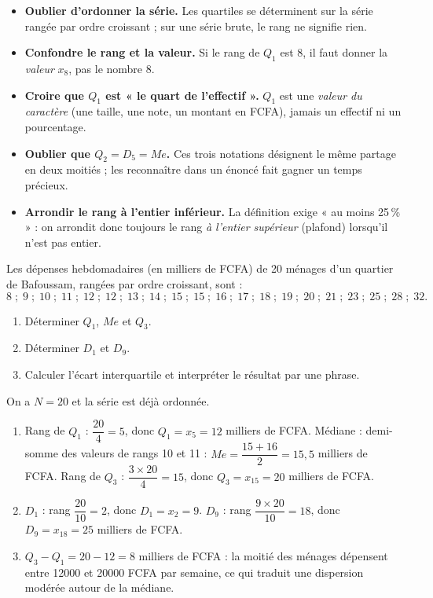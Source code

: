 \documentclass[11pt]{article}
\begin{document}
\begin{attention}
\begin{itemize}
\item \textbf{Oublier d'ordonner la série.} Les quartiles se déterminent sur la série rangée par ordre croissant ; sur une série brute, le rang ne signifie rien.
\item \textbf{Confondre le rang et la valeur.} Si le rang de $Q_1$ est 8, il faut donner la \emph{valeur} $x_8$, pas le nombre 8.
\item \textbf{Croire que $Q_1$ est « le quart de l'effectif ».} $Q_1$ est une \emph{valeur du caractère} (une taille, une note, un montant en FCFA), jamais un effectif ni un pourcentage.
\item \textbf{Oublier que $Q_2 = D_5 = Me$.} Ces trois notations désignent le même partage en deux moitiés ; les reconnaître dans un énoncé fait gagner un temps précieux.
\item \textbf{Arrondir le rang à l'entier inférieur.} La définition exige « au moins 25\,\% » : on arrondit donc toujours le rang \emph{à l'entier supérieur} (plafond) lorsqu'il n'est pas entier.
\end{itemize}
\end{attention}

\begin{exercice}
Les dépenses hebdomadaires (en milliers de FCFA) de 20 ménages d'un quartier de Bafoussam, rangées par ordre croissant, sont :
\[ 8 \;;\; 9 \;;\; 10 \;;\; 11 \;;\; 12 \;;\; 12 \;;\; 13 \;;\; 14 \;;\; 15 \;;\; 15 \;;\; 16 \;;\; 17 \;;\; 18 \;;\; 19 \;;\; 20 \;;\; 21 \;;\; 23 \;;\; 25 \;;\; 28 \;;\; 32. \]
\begin{enumerate}
\item Déterminer $Q_1$, $Me$ et $Q_3$.
\item Déterminer $D_1$ et $D_9$.
\item Calculer l'écart interquartile et interpréter le résultat par une phrase.
\end{enumerate}
\end{exercice}

\begin{corrige}
On a $N = 20$ et la série est déjà ordonnée.
\begin{enumerate}
\item Rang de $Q_1$ : $\dfrac{20}{4} = 5$, donc $Q_1 = x_5 = 12$ milliers de FCFA. Médiane : demi-somme des valeurs de rangs 10 et 11 : $Me = \dfrac{15 + 16}{2} = 15,5$ milliers de FCFA. Rang de $Q_3$ : $\dfrac{3 \times 20}{4} = 15$, donc $Q_3 = x_{15} = 20$ milliers de FCFA.
\item $D_1$ : rang $\dfrac{20}{10} = 2$, donc $D_1 = x_2 = 9$. $D_9$ : rang $\dfrac{9 \times 20}{10} = 18$, donc $D_9 = x_{18} = 25$ milliers de FCFA.
\item $Q_3 - Q_1 = 20 - 12 = 8$ milliers de FCFA : la moitié des ménages dépensent entre \num{12000} et \num{20000} FCFA par semaine, ce qui traduit une dispersion modérée autour de la médiane.
\end{enumerate}
\end{corrige}
\end{document}
